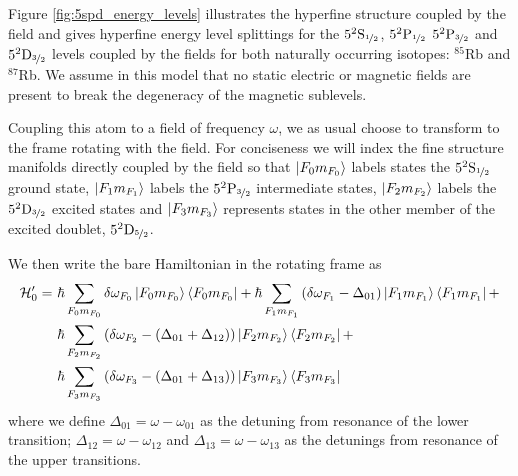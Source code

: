 
    Figure \ref{fig:5spd_energy_levels} illustrates the hyperfine structure
    coupled by the field and gives hyperfine energy level splittings for the
    $5^2\rm{S}_{\nicefrac{1}{2}}$, $5^2\rm{P}_{\nicefrac{1}{2}}$
    $5^2\rm{P}_{\nicefrac{3}{2}}$ and $5^2\rm{D}_{\nicefrac{3}{2}}$ levels
    coupled by the fields for both naturally occurring isotopes: $^{85}$Rb and
    $^{87}$Rb. We  assume in this model that no static electric or magnetic
    fields are present to break the degeneracy of the magnetic sublevels.

    Coupling this atom to a field of frequency $\omega$, we as usual choose to
    transform to the frame rotating with the field. For conciseness we will
    index the fine structure manifolds directly coupled by the field so that
    $\Ket{F_0 m_{F_0}}$ labels states the $5^2\rm{S}_{\nicefrac{1}{2}}$ ground
    state, $\Ket{F_1 m_{F_1}}$ labels the $5^2\rm{P}_{\nicefrac{3}{2}}$
    intermediate states, $\Ket{F_2 m_{F_2}}$ labels the
    $5^2\rm{D}_{\nicefrac{3}{2}}$ excited states and $\Ket{F_3 m_{F_3}}$
    represents states in the other member of the excited doublet,
    $5^2\rm{D}_{\nicefrac{5}{2}}$.

    We then write the bare Hamiltonian in the rotating frame as 
    \begin{align}
      \mathcal{H}_0' =~ 
        & \hbar \sum_{F_0 m_{F_0}} \delta \omega_{F_0} 
        \Ket{F_0 m_{F_0}} \Bra{F_0 m_{F_0}} + 
        \hbar \sum_{F_1 m_{F_1}} \left( \delta \omega_{F_1} - 
            \Delta_{01} \right)
        \Ket{F_1 m_{F_1}} \Bra{F_1 m_{F_1}} + \nonumber \\
        & \hbar \sum_{F_2 m_{F_2}} \left( \delta \omega_{F_2} - 
            (\Delta_{01} + \Delta_{12})
        \right) \Ket{F_2 m_{F_2}} \Bra{F_2 m_{F_2}} + \nonumber \\
        & \hbar \sum_{F_3 m_{F_3}} \left( \delta \omega_{F_3} - 
            (\Delta_{01} + \Delta_{13})
        \right) \Ket{F_3 m_{F_3}} \Bra{F_3 m_{F_3}}
    \end{align}
    where we define $\Delta_{01} = \omega - \omega_{01}$ as the detuning from
    resonance of the lower transition; $\Delta_{12} = \omega - \omega_{12}$ and
    $\Delta_{13} = \omega - \omega_{13}$ as the detunings from resonance of the
    upper transitions.


